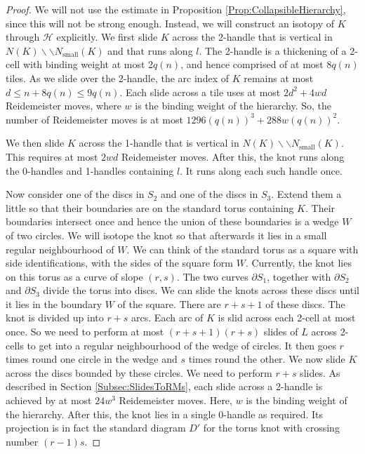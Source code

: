 \documentclass[oneside]{amsart}
\numberwithin{equation}{section}
\theoremstyle{plain}
\theoremstyle{definition}
\newcommand{\cut}{\backslash\backslash}
\newcommand{\calH}{\mathcal{H}}
\begin{document}
\begin{proof}
We will not use the estimate in Proposition \ref{Prop:CollapsibleHierarchy}, since this will not be strong enough. 
Instead, we will construct an isotopy of $K$ through $\calH$ explicitly. We first slide $K$ across the 2-handle 
that is vertical in $N(K) \cut N_{\textrm{small}}(K)$ and that runs along $l$. The 2-handle is a thickening of a 2-cell with binding weight at most 2$q(n)$, and hence comprised of at most $8q(n)$ tiles. As we slide over the 2-handle, the arc index of $K$ remains at most $d \leq n + 8q(n) \leq 9q(n)$. Each slide across a tile uses at most $2d^2+4wd$ Reidemeister moves, where $w$ is the binding weight of the hierarchy. So, the number of Reidemeister moves is at most $1296 (q(n))^3 + 288 w (q(n))^2$.

We then slide $K$ across the 1-handle that is vertical in $N(K) \cut N_{\textrm{small}}(K)$. This requires at most $2wd$ Reidemeister moves. After this, the knot runs along the 0-handles and 1-handles containing $l$. It runs along each such handle once.

Now consider one of the discs in $S_2$ and one of the discs in $S_3$.  Extend them a little so that their boundaries are on the standard torus containing $K$.
Their boundaries intersect once and hence the union of these boundaries is a wedge $W$ of two circles. We will isotope the knot so that afterwards it lies in a small regular neighbourhood of $W$. We can think of the standard torus as a square with side identifications, with the sides of the square form $W$. Currently, the knot lies on this torus as a curve of slope $(r,s)$. The two curves $\partial S_1$, together with $\partial S_2$ and $\partial S_3$ divide the torus into discs. We can slide the knots across these discs until it lies in the boundary $W$ of the square. There are $r+s+1$ of these discs. The knot is divided up into $r+s$ arcs. Each arc of $K$ is slid across each 2-cell at most once. So we need to perform at most $(r+s+1)(r+s)$ slides of $L$ across 2-cells to get into a regular neighbourhood of the wedge of circles. It then goes $r$ times round one circle in the wedge and $s$ times round the other. We now slide $K$ across the discs bounded by these circles. We need to perform $r+s$ slides. As described in Section \ref{Subsec:SlidesToRMs}, each slide across a 2-handle is achieved by at most $24w^3$ Reidemeister moves. Here, $w$ is the binding weight of the hierarchy. After this, the knot lies in a single 0-handle as required. Its projection is in fact the standard diagram $D'$ for the torus knot with crossing number $(r-1)s$.


\end{proof}
\end{document}
